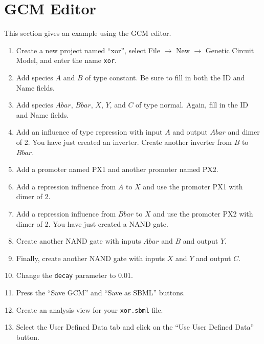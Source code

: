 \documentclass[titlepage,11pt]{article}
\begin{document}
\section{GCM Editor}

This section gives an example using the GCM editor.
\begin{enumerate}
\item Create a new project named ``xor'',
      select File $\rightarrow$ New $\rightarrow$ Genetic Circuit Model, 
      and enter the name {\tt xor}.

\item Add species $A$ and $B$ of type constant.  Be sure to fill in both
      the ID and Name fields.

\item Add species $Abar$, $Bbar$, $X$, $Y$, and $C$ of type normal.  Again,
      fill in the ID and Name fields.

\item Add an influence of type repression with input $A$ and output $Abar$ and 
      dimer of 2.  You have just created an inverter.
      Create another inverter from $B$ to $Bbar$.

\item Add a promoter named PX1 and another promoter named PX2.

\item Add a repression influence from $A$ to $X$ and use the promoter 
      PX1 with dimer of 2.

\item Add a repression influence from $Bbar$ to $X$ and use the promoter 
      PX2 with dimer of 2.  You have just created a NAND gate.

\item Create another NAND gate with inputs $Abar$ and $B$ and output $Y$.

\item Finally, create another NAND gate with inputs $X$ and $Y$ and 
      output $C$.

\item Change the {\tt decay} parameter to 0.01.

\item Press the ``Save GCM'' and ``Save as SBML'' buttons.

\item Create an analysis view for your {\tt xor.sbml} file.

\item Select the User Defined Data tab and click on the 
      ``Use User Defined Data'' button.


\end{enumerate}
\end{document}
